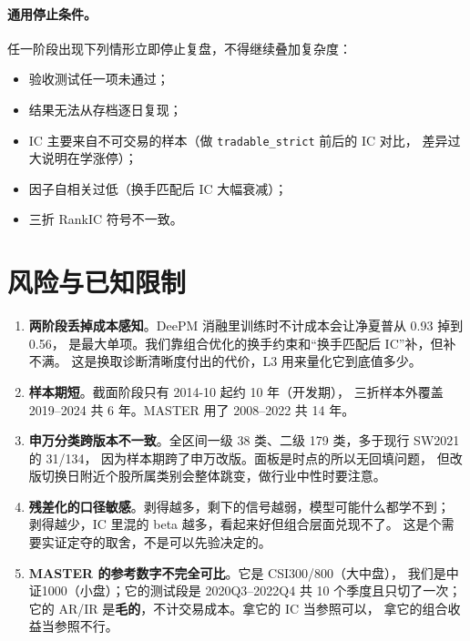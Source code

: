 \documentclass[11pt, a4paper]{ctexart}
\newcommand{\file}[1]{\texttt{\small #1}}
\begin{document}
\paragraph{通用停止条件。}任一阶段出现下列情形立即停止复盘，不得继续叠加复杂度：
\begin{itemize}
  \item 验收测试任一项未通过；
  \item 结果无法从存档逐日复现；
  \item IC 主要来自不可交易的样本（做 \file{tradable\_strict} 前后的 IC 对比，
        差异过大说明在学涨停）；
  \item 因子自相关过低（换手匹配后 IC 大幅衰减）；
  \item 三折 RankIC 符号不一致。
\end{itemize}

\section{风险与已知限制}

\begin{enumerate}
  \item \textbf{两阶段丢掉成本感知}。DeePM 消融里训练时不计成本会让净夏普从 0.93 掉到 0.56，
        是最大单项。我们靠组合优化的换手约束和“换手匹配后 IC”补，但补不满。
        这是换取诊断清晰度付出的代价，L3 用来量化它到底值多少。
  \item \textbf{样本期短}。截面阶段只有 2014-10 起约 10 年（开发期），
        三折样本外覆盖 2019--2024 共 6 年。MASTER 用了 2008--2022 共 14 年。
  \item \textbf{申万分类跨版本不一致}。全区间一级 38 类、二级 179 类，多于现行 SW2021 的 31/134，
        因为样本期跨了申万改版。面板是时点的所以无回填问题，
        但改版切换日附近个股所属类别会整体跳变，做行业中性时要注意。
  \item \textbf{残差化的口径敏感}。剥得越多，剩下的信号越弱，模型可能什么都学不到；
        剥得越少，IC 里混的 beta 越多，看起来好但组合层面兑现不了。
        这是个需要实证定夺的取舍，不是可以先验决定的。
  \item \textbf{MASTER 的参考数字不完全可比}。它是 CSI300/800（大中盘），
        我们是中证1000（小盘）；它的测试段是 2020Q3--2022Q4 共 10 个季度且只切了一次；
        它的 AR/IR 是\textbf{毛的}，不计交易成本。拿它的 IC 当参照可以，
        拿它的组合收益当参照不行。
\end{enumerate}

\appendix
\end{document}

